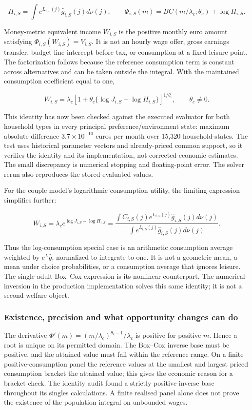 \documentclass[11pt,a4paper]{article}
\begin{document}
\[H_{i,S}=\int e^{L_{i,S}(j)}\widehat g_{i,S}(j)d\nu(j),\qquad
\Phi_{i,S}(m)=BC(m/\lambda_c;\theta_c)+\log H_{i,S}.\]

Money-metric equivalent income \(W_{i,S}\) is the positive monthly euro amount satisfying \(\Phi_{i,S}(W_{i,S})=V_{i,S}\). It is not an hourly wage offer, gross earnings transfer, budget-line intercept before tax, or consumption at a fixed leisure point. The factorization follows because the reference consumption term is constant across alternatives and can be taken outside the integral. With the maintained consumption coefficient equal to one,

\[\boxed{W_{i,S}=\lambda_c\left[1+\theta_c\{\log J_{i,S}-\log H_{i,S}\}\right]^{1/\theta_c}},\qquad\theta_c\ne0.\]

This identity has now been checked against the executed evaluator for both household types in every principal preference/environment state: maximum absolute difference \(3.7\times10^{-10}\) euros per month over 15,320 household-states. The test uses historical parameter vectors and already-priced common support, so it verifies the identity and its implementation, not corrected economic estimates. The small discrepancy is numerical stopping and floating-point error. The solver rerun also reproduces the stored evaluated values.

For the couple model's logarithmic consumption utility, the limiting expression simplifies further:

\[\boxed{W_{i,S}=\lambda_c e^{\log J_{i,S}-\log H_{i,S}}
=\frac{\int C_{i,S}(j)e^{L_{i,S}(j)}\widehat g_{i,S}(j)d\nu(j)}
{\int e^{L_{i,S}(j)}\widehat g_{i,S}(j)d\nu(j)}}.\]

Thus the log-consumption special case is an arithmetic consumption average weighted by \(e^L\widehat g\), normalized to integrate to one. It is not a geometric mean, a mean under choice probabilities, or a consumption average that ignores leisure. The single-adult Box--Cox expression is its nonlinear counterpart. The numerical inversion in the production implementation solves this same identity; it is not a second welfare object.

\subsubsection{Existence, precision and what opportunity changes can do}\label{existence-precision-and-what-opportunity-changes-can-do}

The derivative \(\Phi'(m)=(m/\lambda_c)^{\theta_c-1}/\lambda_c\) is positive for positive \(m\). Hence a root is unique on its permitted domain. The Box--Cox inverse base must be positive, and the attained value must fall within the reference range. On a finite positive-consumption panel the reference values at the smallest and largest priced consumption bracket the attained value; this gives the economic reason for a bracket check. The identity audit found a strictly positive inverse base throughout its singles calculations. A finite realised panel alone does not prove the existence of the population integral on unbounded wages.
\end{document}
